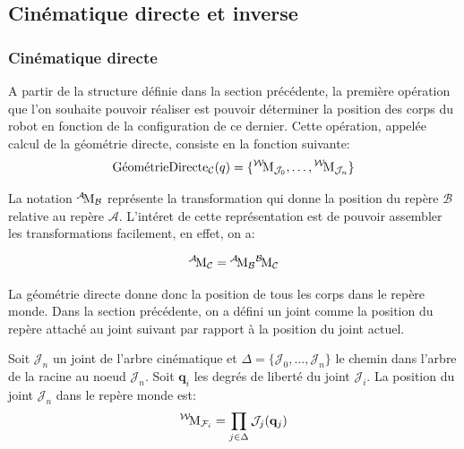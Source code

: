 \subsection{Cinématique directe et inverse}

\subsubsection{Cinématique directe}

A partir de la structure définie dans la section précédente, la
première opération que l'on souhaite pouvoir réaliser est pouvoir
déterminer la position des corps du robot en fonction de la
configuration de ce dernier. Cette opération, appelée calcul de la géométrie directe, consiste en la fonction suivante:
\begin{equation}
  \text{GéométrieDirecte}_{\mathcal{C}}(q) = \{
  {}^{\mathcal{W}}\!\text{M}_{\mathcal{J}_0}, \dotsc,
  {}^{\mathcal{W}}\!\text{M}_{\mathcal{J}_n} \}
\end{equation}

La notation ${}^{\mathcal{A}}\!\text{M}_{\mathcal{B}}$ représente la
transformation qui donne la position du repère $\mathcal{B}$ relative
au repère $\mathcal{A}$. L'intéret de cette représentation est de pouvoir assembler les transformations facilement, en effet, on a:

\begin{equation}
  {}^{\mathcal{A}}\!\text{M}_{\mathcal{C}} = {}^{\mathcal{A}}\!\text{M}_{\mathcal{B}} {}^{\mathcal{B}}\!\text{M}_{\mathcal{C}}
\end{equation}


La géométrie directe donne donc la position de tous les corps dans le
repère monde. Dans la section précédente, on a défini un joint comme
la position du repère attaché au joint suivant par rapport à la
position du joint actuel.

\begin{mydef}\label{def:chap2-geomdirect}
Soit $\mathcal{J}_n$ un joint de l'arbre cinématique et $\Delta =
\{\mathcal{J}_0, \dotsc, \mathcal{J}_n\}$ le chemin dans l'arbre de la
racine au noeud $\mathcal{J}_n$. Soit $\mathbf{q}_i$ les degrés de
liberté du joint $\mathcal{J}_i$. La position du joint $\mathcal{J}_n$
dans le repère monde est:
\begin{equation}
  {}^{\mathcal{W}}\!\text{M}_{\mathcal{F}_i} = \prod_{j \in \Delta} \mathcal{J}_j (\mathbf{q}_j)
\end{equation}
\end{mydef}


